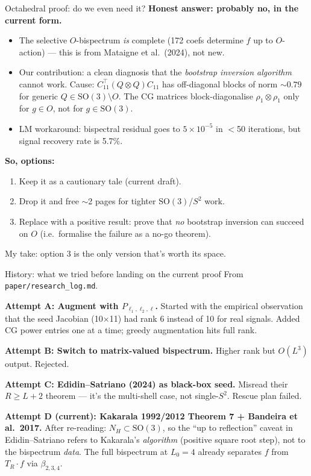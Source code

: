 \documentclass[10pt,aspectratio=169]{beamer}
\newcommand{\SO}{\mathrm{SO}}
\begin{document}
\begin{frame}{Octahedral proof: do we even need it?}
\small
\textbf{Honest answer: probably no, in the current form.}
\begin{itemize}
  \item The selective $O$-bispectrum \emph{is} complete (172 coefs determine
        $f$ up to $O$-action) --- this is from
        Mataigne et al.\ (2024), not new.
  \item Our contribution: a clean diagnosis that the
        \emph{bootstrap inversion algorithm} cannot work.
        Cause: $C_{11}^\top (Q\otimes Q) C_{11}$ has off-diagonal blocks of
        norm $\sim 0.79$ for generic $Q \in \SO(3) \setminus O$.
        The CG matrices block-diagonalise $\rho_1\otimes\rho_1$ only for
        $g \in O$, not for $g \in \SO(3)$.
  \item LM workaround: bispectral residual goes to $5{\times}10^{-5}$ in
        $<$50 iterations, but \alert{signal recovery rate is 5.7\%}.
\end{itemize}
\vspace{0.4em}
\textbf{So, options:}
\begin{enumerate}
  \item Keep it as a cautionary tale (current draft).
  \item Drop it and free $\sim$2 pages for tighter $\SO(3)$/$S^2$ work.
  \item Replace with a positive result: prove that \emph{no} bootstrap
        inversion can succeed on $O$ (i.e.\ formalise the failure as a
        no-go theorem).
\end{enumerate}
My take: option 3 is the only version that's worth its space.
\end{frame}

\begin{frame}{History: what we tried before landing on the current proof}
From \texttt{paper/research\_log.md}.
\vspace{0.4em}

\textbf{Attempt A: Augment with $P_{\ell_1,\ell_2,\ell}$.}
Started with the empirical observation that the seed Jacobian (10$\times$11)
had rank 6 instead of 10 for real signals. Added CG power entries one at a
time; greedy augmentation hits full rank.

\textbf{Attempt B: Switch to matrix-valued bispectrum.} Higher rank but
$O(L^3)$ output. Rejected.

\textbf{Attempt C: Edidin--Satriano (2024) as black-box seed.}
Misread their $R \ge L+2$ theorem --- it's the multi-shell case, not
single-$S^2$. Rescue plan failed.

\textbf{Attempt D (current): Kakarala 1992/2012 Theorem 7 + Bandeira et al.\ 2017.}
After re-reading: $N_H \subset \SO(3)$, so the ``up to reflection''
caveat in Edidin--Satriano refers to Kakarala's
\emph{algorithm} (positive square root step), not to the bispectrum
\emph{data}. The full bispectrum at $L_0 = 4$ already separates $f$
from $T_R \cdot f$ via $\beta_{2,3,4}$.
\end{frame}
\end{document}
